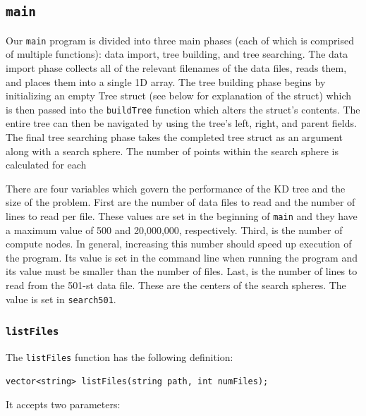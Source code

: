 \documentclass{article}
\begin{document}
%
%

\subsection{\texttt{main}}

Our \texttt{main} program is divided into three main phases (each of which is comprised of multiple functions): data import, tree building, and tree searching. The data import phase collects all of the relevant filenames of the data files, reads them, and places them into a single 1D array. The tree building phase begins by initializing an empty Tree struct (see below for explanation of the struct) which is then passed into the \texttt{buildTree} function which alters the struct's contents. The entire tree can then be navigated by using the tree's left, right, and parent fields. The final tree searching phase takes the completed tree struct as an argument along with a search sphere. The number of points within the search sphere is calculated for each

There are four variables which govern the performance of the KD tree and the size of the problem. First are the number of data files to read and the number of lines to read per file. These values are set in the beginning of \texttt{main} and they have a maximum value of 500 and 20,000,000, respectively. Third, is the number of compute nodes. In general, increasing this number should speed up execution of the program. Its value is set in the command line when running the program and its value must be smaller than the number of files. Last, is the number of lines to read from the 501-st data file. These are the centers of the search spheres. The value is set in \texttt{search501}.


%
%

\subsubsection{\texttt{listFiles}}\label{sec:listfiles}

The \texttt{listFiles} function has the following definition:

\lstset{language=C++, keepspaces=true}
\begin{lstlisting}
vector<string> listFiles(string path, int numFiles); 
\end{lstlisting}

It accepts two parameters:
\end{document}
